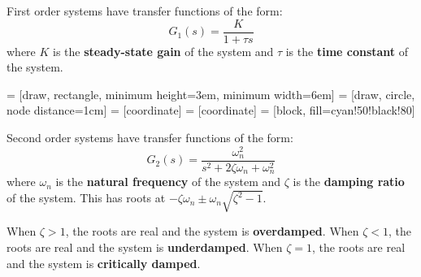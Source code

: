 \documentclass[11pt]{article}
\begin{document}
First order systems have transfer functions of the form:
$$
G_{1}(s) = \frac{K}{1 + \tau s}
$$
where \(K\) is the \textbf{steady-state gain} of the system and \(\tau\) is the
\textbf{time constant} of the system.

 = [draw, rectangle, minimum height=3em, minimum width=6em]
 = [draw, circle, node distance=1cm]
 = [coordinate]
 = [coordinate]
 = [block, fill=cyan!50!black!80]
\begin{center}
\end{center}
\vspace{10pt}
\begin{center}
\end{center}

Second order systems have transfer functions of the form:
$$
G_{2}(s) = \frac{\omega_{n}^{2}}{s^{2} + 2 \zeta \omega_{n} + \omega_{n}^{2}}
$$
where \(\omega_{n}\) is the \textbf{natural frequency} of the system and \(\zeta\) is the
\textbf{damping ratio} of the system.
This has roots at \(-\zeta \omega_{n} \pm \omega_{n} \sqrt{\zeta^{2} - 1}\).

When \(\zeta > 1\), the roots are real and the system is \textbf{overdamped}.
When \(\zeta < 1\), the roots are real and the system is \textbf{underdamped}.
When \(\zeta = 1\), the roots are real and the system is \textbf{critically damped}.
\end{document}
